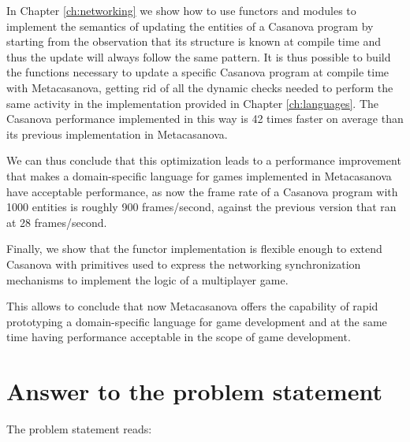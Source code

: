 In Chapter \ref{ch:networking} we show how to use functors and modules to implement the semantics of updating the entities of a Casanova program by starting from the observation that its structure is known at compile time and thus the update will always follow the same pattern. It is thus possible to build the functions necessary to update a specific Casanova program at compile time with Metacasanova, getting rid of all the dynamic checks needed to perform the same activity in the implementation provided in Chapter \ref{ch:languages}. The Casanova performance implemented in this way is 42 times faster on average than its previous implementation in Metacasanova.

We can thus conclude that this optimization leads to a performance improvement that makes a domain-specific language for games implemented in Metacasanova have acceptable performance, as now the frame rate of a Casanova program with 1000 entities is roughly 900 frames/second, against the previous version that ran at 28 frames/second.

Finally, we show that the functor implementation is flexible enough to extend Casanova with primitives used to express the networking synchronization mechanisms to implement the logic of a multiplayer game.

This allows to conclude that now Metacasanova offers the capability of rapid prototyping a domain-specific language for game development and at the same time having performance acceptable in the scope of game development.

\section{Answer to the problem statement}
\label{subsec:ch_conclusion_problem_statement}
The problem statement reads:\\\\
\\

